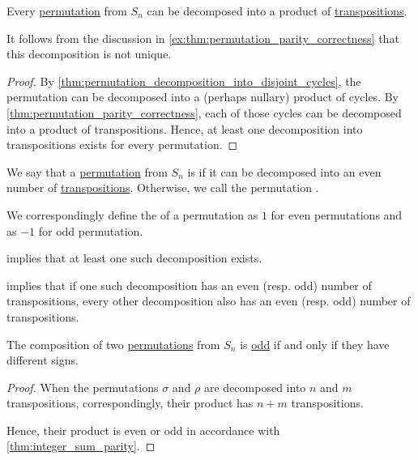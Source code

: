 \begin{proposition}\label{thm:permutation_decomposition_existence}
  Every \hyperref[def:symmetric_group]{permutation} from \( S_n \) can be decomposed into a product of \hyperref[def:cyclic_permutation]{transpositions}.
\end{proposition}
\begin{comments}
  \item It follows from the discussion in \cref{ex:thm:permutation_parity_correctness} that this decomposition is not unique.
\end{comments}
\begin{proof}
  By \cref{thm:permutation_decomposition_into_disjoint_cycles}, the permutation can be decomposed into a (perhaps nullary) product of cycles. By \cref{thm:permutation_parity_correctness}, each of those cycles can be decomposed into a product of transpositions. Hence, at least one decomposition into transpositions exists for every permutation.
\end{proof}

\begin{definition}\label{def:permutation_parity}\mimprovised
  We say that a \hyperref[def:symmetric_group]{permutation} from \( S_n \) is  if it can be decomposed into an even number of \hyperref[def:cyclic_permutation]{transpositions}. Otherwise, we call the permutation .

  We correspondingly define the  of a permutation as \( 1 \) for even permutations and as \( -1 \) for odd permutation.
\end{definition}
\begin{defproof}
   implies that at least one such decomposition exists.

   implies that if one such decomposition has an even (resp. odd) number of transpositions, every other decomposition also has an even (resp. odd) number of transpositions.
\end{defproof}

\begin{proposition}\label{thm:permutation_product_parity}
  The composition of two \hyperref[def:symmetric_group]{permutations} from \( S_n \) is \hyperref[def:permutation_parity]{odd} if and only if they have different signs.
\end{proposition}
\begin{proof}
  When the permutations \( \sigma \) and \( \rho \) are decomposed into \( n \) and \( m \) transpositions, correspondingly, their product has \( n + m \) transpositions.

  Hence, their product is even or odd in accordance with \cref{thm:integer_sum_parity}.
\end{proof}

